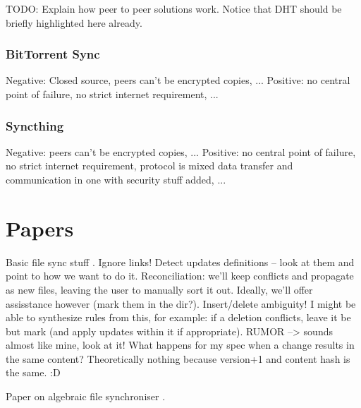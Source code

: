 TODO: Explain how peer to peer solutions work.
Notice that DHT should be briefly highlighted here already.

\subsubsection{BitTorrent Sync}

Negative: Closed source, peers can't be encrypted copies, ...
Positive: no central point of failure, no strict internet requirement, ...

\subsubsection{Syncthing}

Negative: peers can't be encrypted copies, ...
Positive: no central point of failure, no strict internet requirement, protocol is mixed data transfer and communication in one with security stuff added, ...

\section{Papers}


Basic file sync stuff \cite{balasubramaniam1998file}.
Ignore links!
Detect updates definitions – look at them and point to how we want to do it.
Reconciliation: we'll keep conflicts and propagate as new files, leaving the user to manually sort it out.
Ideally, we'll offer assisstance however (mark them in the dir?).
Insert/delete ambiguity!
I might be able to synthesize rules from this, for example: if a deletion conflicts, leave it be but mark (and apply updates within it if appropriate).
RUMOR --> sounds almost like mine, look at it!
What happens for my spec when a change results in the same content?
Theoretically nothing because version+1 and content hash is the same. :D

Paper on algebraic file synchroniser \cite{ramsey2001algebraic}.
